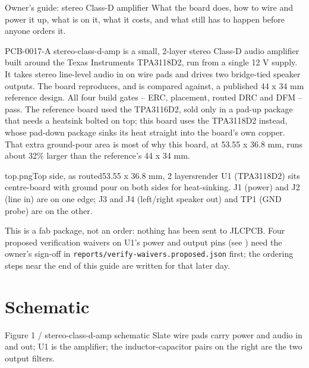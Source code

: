 
\setlength{\tabcolsep}{4pt}


%
{Owner's guide: stereo Class-D amplifier}%
{What the board does, how to wire and power it up, what is on it, what it
costs, and what still has to happen before anyone orders it.}

PCB-0017-A stereo-class-d-amp is a small, 2-layer stereo Class-D audio amplifier built
around the Texas Instruments TPA3118D2, run from a single 12 V supply. It
takes stereo line-level audio in on wire pads and drives two bridge-tied
speaker outputs. The board reproduces, and is compared against, a published
44 x 34 mm reference design. All four build gates -- ERC,
placement, routed DRC and DFM -- pass. The reference board used the TPA3116D2,
sold only in a pad-up package that needs a heatsink bolted on top; this
board uses the TPA3118D2 instead, whose pad-down package sinks its heat
straight into the board's own copper. That extra ground-pour area is most of
why this board, at 53.55 x 36.8 mm, runs about 32\% larger than the
reference's 44 x 34 mm.

\begin{hsplate}{top.png}{Top side, as routed}{53.55 x 36.8 mm, 2 layers}{render}%
{U1 (TPA3118D2) sits centre-board with ground pour on both sides for
heat-sinking. J1 (power) and J2 (line in) are on one edge; J3 and J4
(left/right speaker out) and TP1 (GND probe) are on the other.}
\end{hsplate}

This is a fab package, not an order: nothing has been sent to JLCPCB. Four
proposed verification waivers on U1's power and output pins (see
) need the owner's sign-off in
\texttt{reports/verify-waivers.proposed.json} first; the ordering steps
near the end of this guide are written for that later day.

\section{Schematic}

\begin{hsfigure}{Figure 1 / stereo-class-d-amp schematic}%
{Slate wire pads carry power and audio in and out; U1 is the amplifier; the
inductor-capacitor pairs on the right are the two output filters.}
\end{hsfigure}

